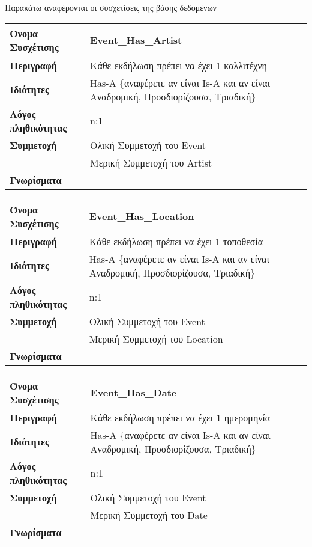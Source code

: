 Παρακάτω αναφέρονται οι συσχετίσεις της βάσης δεδομένων \titlos

\begin{tabular}[]{|p{4cm}|p{10cm}|}
  \hline
  \textbf{Όνομα Συσχέτισης} & Event\_Has\_Artist\\ \hline
  \textbf{Περιγραφή} & Κάθε εκδήλωση πρέπει να έχει 1 καλλιτέχνη\\ \hline
  \textbf{Ιδιότητες} & Has-A \{αναφέρετε αν είναι Is-A και αν είναι
                       Αναδρομική, Προσδιορίζουσα, Τριαδική\} \\ \hline
  \textbf{Λόγος πληθικότητας} & n:1 \\ \hline
  \textbf{Συμμετοχή} & Ολική Συμμετοχή του Event \\ \cline{2-2}
                     & Μερική Συμμετοχή του Artist \\ \hline
  \textbf{Γνωρίσματα} & - \\ \hline
\end{tabular}


\begin{tabular}[]{|p{4cm}|p{10cm}|}
  \hline
  \textbf{Όνομα Συσχέτισης} & Event\_Has\_Location\\ \hline
  \textbf{Περιγραφή} & Κάθε εκδήλωση πρέπει να έχει 1 τοποθεσία\\ \hline
  \textbf{Ιδιότητες} & Has-A \{αναφέρετε αν είναι Is-A και αν είναι
                       Αναδρομική, Προσδιορίζουσα, Τριαδική\} \\ \hline
  \textbf{Λόγος πληθικότητας} & n:1 \\ \hline
  \textbf{Συμμετοχή} & Ολική Συμμετοχή του Event \\ \cline{2-2}
                     & Μερική Συμμετοχή του Location \\ \hline
  \textbf{Γνωρίσματα} & - \\ \hline
\end{tabular}


\begin{tabular}[]{|p{4cm}|p{10cm}|}
  \hline
  \textbf{Όνομα Συσχέτισης} & Event\_Has\_Date\\ \hline
  \textbf{Περιγραφή} & Κάθε εκδήλωση πρέπει να έχει 1 ημερομηνία\\ \hline
  \textbf{Ιδιότητες} & Has-A \{αναφέρετε αν είναι Is-A και αν είναι
                       Αναδρομική, Προσδιορίζουσα, Τριαδική\} \\ \hline
  \textbf{Λόγος πληθικότητας} & n:1 \\ \hline
  \textbf{Συμμετοχή} & Ολική Συμμετοχή του Event \\ \cline{2-2}
                     & Μερική Συμμετοχή του Date \\ \hline
  \textbf{Γνωρίσματα} & - \\ \hline
\end{tabular}



